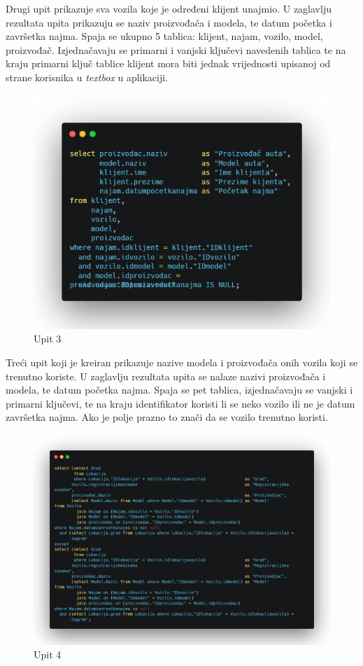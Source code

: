 \documentclass[]{foi} %
\begin{document}
Drugi upit prikazuje sva vozila koje je određeni klijent unajmio. U zaglavlju rezultata upita prikazuju se naziv proizvođača i modela, te datum početka i završetka najma. Spaja se ukupno 5 tablica: klijent, najam, vozilo, model, proizvođač. Izjednačavaju se primarni i vanjski ključevi navedenih tablica te na kraju primarni ključ tablice klijent mora biti jednak vrijednosti upisanoj od strane korisnika u \textit{textbox} u aplikaciji.\\

\begin{figure}[!ht]
    \centering
    \includegraphics[width=1\textwidth]{slike/u3.png}
    \caption{Upit 3}
    \label{fig:upit3}
\end{figure}

Treći upit koji je kreiran prikazuje nazive modela i proizvođača onih vozila koji se trenutno koriste. U zaglavlju rezultata upita se nalaze nazivi proizvođača i modela, te datum početka najma. Spaja se pet tablica, izjednačavaju se vanjski i primarni ključevi, te na kraju identifikator koristi li se neko vozilo ili ne je datum završetka najma. Ako je polje prazno to znači da se vozilo trenutno koristi.
\newpage

\begin{figure}[!ht]
    \centering
    \includegraphics[width=1\textwidth]{slike/u4.png}
    \caption{Upit 4}
    \label{fig:upit4}
\end{figure}
\end{document}
